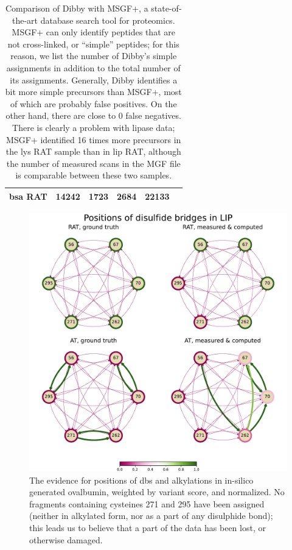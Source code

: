 \begin{table}[hb]
\begin{tabular}{@{}llllll@{}}
    \gls*{bsa} RAT                                       & 14242                           & 1723                                                                   & 2684                              & 22133 &             \\ \bottomrule
  \end{tabular}
  \caption{Comparison of Dibby with MSGF+, a state-of-the-art database search tool for proteomics. MSGF+ can only identify peptides that are not cross-linked, or ``simple'' peptides; for this reason, we list the number of Dibby's simple assignments in addition to the total number of its assignments. Generally, Dibby identifies a bit more simple precursors than MSGF+, most of which are probably false positives. On the other hand, there are close to 0 false negatives. There is clearly a problem with lipase data; MSGF+ identified 16 times more precursors in the \gls*{lys} RAT sample than in \gls*{lip} RAT, although the number of measured scans in the MGF file is comparable between these two samples.}\label{tbl:measurements}
\end{table}

\begin{figure}
  \centering
  \includegraphics[width=0.9\linewidth]{img/lip.pdf}
  \caption{The evidence for positions of \glspl*{db} and alkylations in in-silico generated ovalbumin, weighted by variant score, and normalized. No fragments containing cysteines 271 and 295 have been assigned (neither in alkylated form, nor as a part of any disulphide bond); this leads us to believe that a part of the data has been lost, or otherwise damaged.}\label{fig:lip}
\end{figure}

